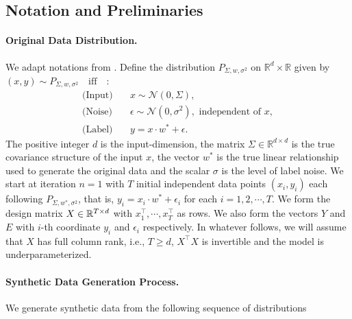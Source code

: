 \subsection{Notation and Preliminaries}

\paragraph{Original Data Distribution.} 

We adapt notations from \cite{dohmatob2024model}. Define the distribution $P_{\Sigma,w,\sigma^2}$ on $\mathbb{R}^d \times \mathbb{R}$ given by $(x, y) \sim P_{\Sigma,w,\sigma^2} \quad \text{iff} \quad$:
\begin{align*}
\text{(Input)} \quad & x \sim \mathcal{N}(0, \Sigma), \\
\text{(Noise)} \quad & \epsilon \sim \mathcal{N}(0, \sigma^2), \text{ independent of } x, \\
\text{(Label)} \quad & y = x \cdot w^* + \epsilon.
\end{align*}
The positive integer $d$ is the input-dimension, the matrix $\Sigma \in \mathbb{R}^{d \times d}$ is the true covariance structure of the input $x$, the vector $w^*$ is the true linear relationship used to generate the original data and the scalar $\sigma$ is the level of label noise. We start at iteration $n=1$ with $T$ initial independent data points $(x_i, y_i)$ each following $P_{\Sigma, w^*, \sigma^2}$, that is, $y_i = x_i\cdot w^* + \epsilon_i$ for each $i=1,2,\cdots, T$. We form the design matrix $X\in\mathbb{R}^{T\times d}$ with $x_1^\top,\cdots, x_T^\top$ as rows. We also form the vectors $Y$ and $E$ with $i$-th coordinate $y_i$ and $\epsilon_i$ respectively. In whatever follows, we will assume that $X$ has full column rank, i.e., $T\geq d$, $X^\top X$ is invertible and the model is underparameterized.

\paragraph{Synthetic Data Generation Process.}

We generate synthetic data from the following sequence of distributions

